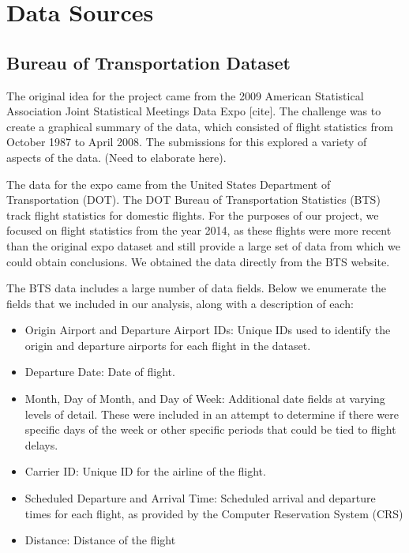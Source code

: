 \documentclass{article}
\begin{document}
\section{Data Sources}

\label{sec:data-sources}
\subsection{Bureau of Transportation Dataset}

The original idea for the project came from the 2009 American Statistical Association Joint Statistical Meetings Data Expo [cite]. The challenge was to create a graphical summary of the data, which consisted of flight statistics from October 1987 to April 2008. The submissions for this explored a variety of aspects of the data. (Need to elaborate here).

The data for the expo came from the United States Department of Transportation (DOT). The DOT Bureau of Transportation Statistics (BTS) track flight statistics for domestic flights. For the purposes of our project, we focused on flight statistics from the year 2014, as these flights were more recent than the original expo dataset and still provide a large set of data from which we could obtain conclusions. We obtained the data directly from the BTS website.  

The BTS data includes a large number of data fields. Below we enumerate the fields that we included in our analysis, along with a description of each:

\begin{itemize}
\item Origin Airport and Departure Airport IDs: Unique IDs used to identify the origin and departure airports for each flight in the dataset. 
\item Departure Date: Date of flight. 
\item Month, Day of Month, and Day of Week: Additional date fields at varying levels of detail. These were included in an attempt to determine if there were specific days of the week or other specific periods that could be tied to flight delays. 
\item Carrier ID: Unique ID for the airline of the flight.
\item Scheduled Departure and Arrival Time: Scheduled arrival and departure times for each flight, as provided by the Computer Reservation System (CRS)
\item Distance: Distance of the flight
\end{itemize}
\end{document}
